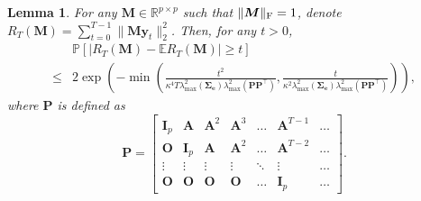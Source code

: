 \documentclass[12pt]{article}
\newtheorem{lemma}{Lemma}
\newcommand{\bm}{\boldsymbol}
\begin{document}
\begin{lemma}
	\label{lemma:deviation2}
	For any $\bm{M}\in\mathbb{R}^{p\times p}$ such that $\|\bm{M}\|_{\textup{F}}=1$, denote $R_T(\bm{M})=\sum_{t=0}^{T-1}\|\bm{M}\bm{y}_t\|_2^2$. Then, for any $t>0$,
	\begin{equation}
	\begin{split}
	&\mathbb{P}[|R_T(\bm{M})-\mathbb{E}R_T(\bm{M})|\geq t]\\
	\leq&2\exp\left(-\min\left(\frac{t^2}{\kappa^4T\lambda_{\max}^2(\bm{\Sigma_e})\lambda_{\max}^2(\bm{PP}^\top)},\frac{t}{\kappa^2\lambda_{\max}^2(\bm{\Sigma_e})\lambda_{\max}^2(\bm{PP}^\top)}\right)\right),
	\end{split}
	\end{equation}
	where $\bm{P}$ is defined as
	\begin{equation}
	\label{eq:P}
	\bm{P}=\begin{bmatrix}
	\bm{I}_p & \bm{A} & \bm{A}^2 & \bm{A}^3 & \dots & \bm{A}^{T-1} & \dots\\
	\bm{O} & \bm{I}_p & \bm{A} & \bm{A}^2 & \dots & \bm{A}^{T-2} & \dots\\
	\vdots & \vdots & \vdots & \vdots & \ddots & \vdots & \dots \\
	\bm{O} & \bm{O} & \bm{O} & \bm{O} & \dots & \bm{I}_p & \dots
	\end{bmatrix}.
	\end{equation}
	
\end{lemma}
\end{document}
